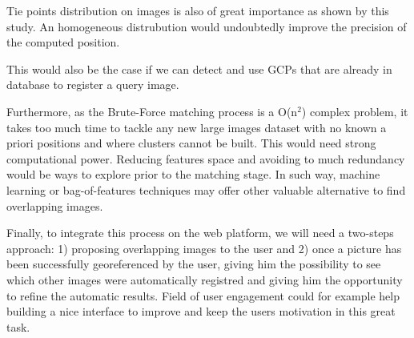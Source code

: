 \documentclass[fleqn,10pt,lineno]{wlpeerj} %
\begin{document}
Tie points distribution on images is also of great importance as shown by this
study. An homogeneous distrubution would undoubtedly improve the precision of the
computed position.

This would also be the case if we can detect and use GCPs that are already 
in database to register a query image. 

Furthermore, as the Brute-Force matching process is a O(n$^{2}$) complex problem, 
it takes too much time to tackle any new large images dataset with no known 
a priori positions and where clusters cannot be built. This would need strong
computational power.
Reducing features space and avoiding to much redundancy would be ways to explore 
prior to the matching stage.
In such way, machine learning or bag-of-features techniques may offer other 
valuable alternative to find overlapping images.


Finally, to integrate this process on the web platform, we will need a two-steps
approach: 1) proposing overlapping images to the user and 2) once a picture has 
been successfully georeferenced by the user, giving him the possibility to see
which other images were automatically registred and giving him the opportunity
to refine the automatic results. Field of user engagement could for example 
help building a nice interface to improve and keep the users motivation in this 
great task.








\end{document}
